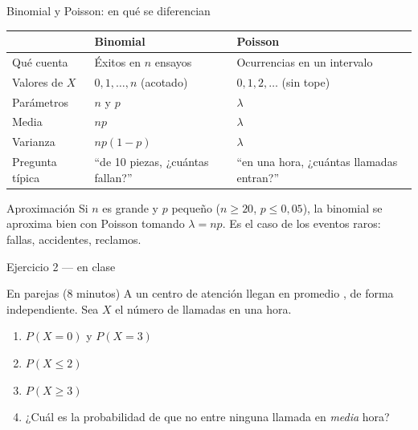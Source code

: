 \documentclass[aspectratio=169,10pt]{beamer}
\begin{document}
\begin{frame}{Binomial y Poisson: en qué se diferencian}
  \footnotesize
  \begin{center}
  \begin{tabular}{@{}lll@{}}
    \toprule
     & \textbf{Binomial} & \textbf{Poisson} \\
    \midrule
    Qué cuenta & Éxitos en $n$ ensayos & Ocurrencias en un intervalo \\
    Valores de $X$ & $0,1,\dots,n$ (acotado) & $0,1,2,\dots$ (sin tope) \\
    Parámetros & $n$ y $p$ & $\lambda$ \\
    Media & $np$ & $\lambda$ \\
    Varianza & $np(1-p)$ & $\lambda$ \\
    Pregunta típica & ``de 10 piezas, ¿cuántas fallan?'' &
      ``en una hora, ¿cuántas llamadas entran?'' \\
    \bottomrule
  \end{tabular}
  \end{center}

  \vspace{0.2cm}
  \begin{exampleblock}{Aproximación}
    \footnotesize
    Si $n$ es grande y $p$ pequeño ($n\ge 20$, $p\le 0{,}05$), la binomial se
    aproxima bien con Poisson tomando $\lambda=np$. Es el caso de los eventos
    raros: fallas, accidentes, reclamos.
  \end{exampleblock}
\end{frame}

\begin{frame}{Ejercicio 2 — en clase}
  \begin{alertblock}{En parejas (8 minutos)}
    A un centro de atención llegan en promedio ,
    de forma independiente. Sea $X$ el número de llamadas en una hora.

    \vspace{0.25cm}
    \begin{enumerate}
      \item $P(X=0)$ y $P(X=3)$
      \item $P(X\le 2)$
      \item $P(X\ge 3)$
      \item ¿Cuál es la probabilidad de que no entre ninguna llamada en
            \emph{media} hora?
    \end{enumerate}
  \end{alertblock}
\end{frame}
\end{document}
